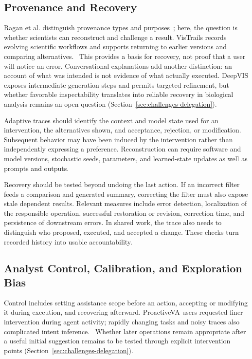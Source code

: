 \subsection{Provenance and Recovery}
\label{sec:evaluation-provenance}
Ragan et al. distinguish provenance types and purposes~\cite{Ragan2016Provenance}; here, the question is whether scientists can reconstruct and challenge a result. VisTrails records evolving scientific workflows and supports returning to earlier versions and comparing alternatives.~\cite{EvalFreire2006} This provides a basis for recovery, not proof that a user will notice an error. Conversational explanations add another distinction: an account of what was intended is not evidence of what actually executed. DeepVIS exposes intermediate generation steps and permits targeted refinement, but whether favorable inspectability translates into reliable recovery in biological analysis remains an open question (Section~\ref{sec:challenges-delegation}).~\cite{EvalShuai2025}

Adaptive traces should identify the context and model state used for an intervention, the alternatives shown, and acceptance, rejection, or modification. Subsequent behavior may have been induced by the intervention rather than independently expressing a preference. Reconstruction can require software and model versions, stochastic seeds, parameters, and learned-state updates as well as prompts and outputs.

Recovery should be tested beyond undoing the last action. If an incorrect filter feeds a comparison and generated summary, correcting the filter must also expose stale dependent results. Relevant measures include error detection, localization of the responsible operation, successful restoration or revision, correction time, and persistence of downstream errors. In shared work, the trace also needs to distinguish who proposed, executed, and accepted a change. These checks turn recorded history into usable accountability.

\subsection{Analyst Control, Calibration, and Exploration Bias}
\label{sec:evaluation-control}
Control includes setting assistance scope before an action, accepting or modifying it during execution, and recovering afterward. ProactiveVA users requested finer intervention during agent activity; rapidly changing tasks and noisy traces also complicated intent inference.~\cite{EvalZhao2025} Whether later operations remain appropriate after a useful initial suggestion remains to be tested through explicit intervention points (Section~\ref{sec:challenges-delegation}).

